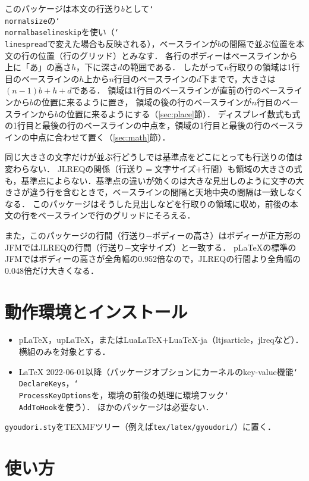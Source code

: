 \documentclass[paper=a4,dvipdfmx]{jlreq}
\newcommand\pkg[1]{\textsf{#1}}
\newcommand\cs[1]{\texttt{\char`\\#1}}
\begin{document}
このパッケージは本文の行送り$b$として\cs{normalsize}の\cs{normalbaselineskip}を使い（\cs{linespread}で変えた場合も反映される），ベースラインが$b$の間隔で並ぶ位置を本文の行の位置（行のグリッド）とみなす．
各行のボディーはベースラインから上に「あ」の高さ$h$，下に深さ$d$の範囲である．
したがって$n$行取りの領域は1行目のベースラインの$h$上から$n$行目のベースラインの$d$下までで，大きさは$(n-1)b+h+d$である．
領域は1行目のベースラインが直前の行のベースラインから$b$の位置に来るように置き，
領域の後の行のベースラインが$n$行目のベースラインから$b$の位置に来るようにする（\ref{sec:place}\nobreak 節）．
ディスプレイ数式も式の1行目と最後の行のベースラインの中点を，領域の1行目と最後の行のベースラインの中点に合わせて置く（\ref{sec:math}\nobreak 節）．

同じ大きさの文字だけが並ぶ行どうしでは基準点をどこにとっても行送りの値は変わらない．
JLREQの関係（行送り$=$文字サイズ$+$行間）も領域の大きさの式も，基準点によらない．基準点の違いが効くのは大きな見出しのように文字の大きさが違う行を含むときで，ベースラインの間隔と天地中央の間隔は一致しなくなる．
このパッケージはそうした見出しなどを行取りの領域に収め，前後の本文の行をベースラインで行のグリッドにそろえる．

また，このパッケージの行間（行送り$-$ボディーの高さ）はボディーが正方形のJFMではJLREQの行間（行送り$-$文字サイズ）と一致する．
pLaTeXの標準のJFMではボディーの高さが全角幅の0.952倍なので，JLREQの行間より全角幅の0.048倍だけ大きくなる．

\section{動作環境とインストール}

\begin{itemize}
\item pLaTeX，upLaTeX，またはLuaLaTeX$+$LuaTeX-ja（\pkg{ltjsarticle}，\pkg{jlreq}など）．
 横組のみを対象とする．
\item \LaTeX{} 2022-06-01以降（パッケージオプションにカーネルのkey-value機能\cs{DeclareKeys}，\cs{ProcessKeyOptions}を，環境の前後の処理に環境フック\cs{AddToHook}を使う）．
 ほかのパッケージは必要ない．
\end{itemize}

\texttt{gyoudori.sty}をTEXMFツリー（例えば\texttt{tex/latex/gyoudori/}）に置く．

\section{使い方}
\end{document}
